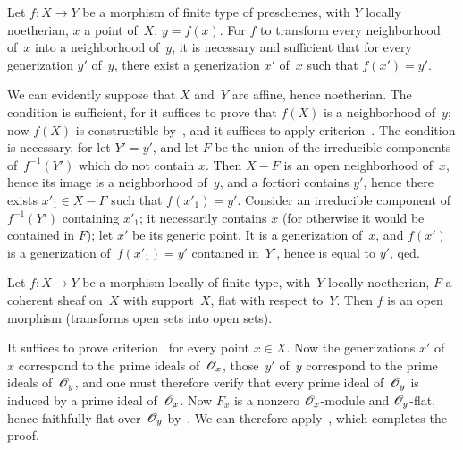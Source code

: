 \begin{corollary}
\label{IV.6.5}
Let $f\colon X\to Y$ be a morphism of finite type of preschemes,
with $Y$ locally noetherian, $x$ a point of~$X$, $y=f(x)$.
For $f$ to transform every neighborhood of~$x$ into a neighborhood of~$y$,
it is necessary and sufficient that for every generization $y'$ of~$y$,
there exist a generization $x'$ of~$x$ such that $f(x')=y'$.
\end{corollary}

We can evidently suppose that $X$ and~$Y$ are affine, hence
noetherian. The condition is sufficient, for it suffices to
prove that $f(X)$ is a neighborhood of~$y$; now $f(X)$ is
constructible by~, and it suffices to apply
criterion~. The condition is necessary, for let
$Y'=\overline{y'}$, and let $F$ be the union of the irreducible
components of~$f^{-1}(Y')$ which do not contain $x$. Then
$X-F$ is an open neighborhood of~$x$, hence its image is a neighborhood
of~$y$, and a fortiori contains $y'$, hence there exists $x'_1\in X-F$ such
that $f(x'_1)=y'$. Consider an irreducible component
of~$f^{-1}(Y')$ containing $x'_1$; it necessarily contains $x$
(for otherwise it would be contained in $F$); let $x'$ be its
generic point. It is a generization of~$x$, and $f(x')$
is a generization of~$f(x'_1)=y'$ contained in~$Y'$, hence
is equal to $y'$, qed.

\begin{theorem}
\label{IV.6.6}
Let $f\colon X\to Y$ be a morphism locally of finite type, with~$Y$
locally noetherian, $F$ a coherent sheaf on~$X$ with
support~$X$, flat with respect to~$Y$. Then $f$ is an
open morphism (\iev transforms open sets into open sets).
\end{theorem}

It suffices to prove criterion~ for every point $x\in
X$. Now the generizations $x'$ of~$x$ correspond to the
prime ideals of~$\cal{O}_x$, those~$y'$ of~$y$ correspond
to the prime ideals of~$\cal{O}_y$, and one must therefore verify
that every prime ideal of~$\cal{O}_y$ is induced by a prime
ideal of~$\cal{O}_x$. Now $F_x$ is a nonzero $\cal{O}_x$-module and
$\cal{O}_y$-flat, hence faithfully flat over~$\cal{O}_y$
by~. We can therefore apply~, which
completes the proof.

